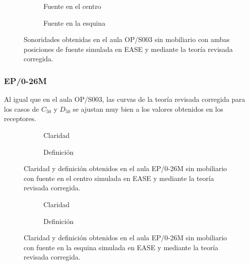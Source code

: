 \begin{figure}[ht]
    \begin{subfigure}[b]{0.4\textwidth}
    	\centering%
         {%
    }
    \caption{Fuente en el centro}%
    \end{subfigure}%
    \hspace{1.9cm}%
    \begin{subfigure}[b]{0.4\textwidth}%
    	\centering%
        {%
    }
    \caption{Fuente en la esquina}%
    \end{subfigure}
    \caption{Sonoridades obtenidas en el aula OP/S003 sin mobiliario con ambas posiciones de fuente simulada en EASE y mediante la teoría revisada corregida.}
\label{graf:sonoridadopesquina}%
\end{figure}
\FloatBarrier 

\subsubsection{EP/0-26M}
Al igual que en el aula OP/S003, las curvas de la teoría revisada corregida para los casos de $C_{50}$ y $D_{50}$ se ajustan muy bien a los valores obtenidos en los receptores.


\begin{figure}[ht]
    \begin{subfigure}[b]{0.4\textwidth}
    	\centering%
         {%
    }
    \caption{Claridad}%
    \end{subfigure}%
    \hspace{1.9cm}%
    \begin{subfigure}[b]{0.4\textwidth}%
    	\centering%
        {%
    }
    \caption{Definición}%
    \end{subfigure}
    \caption{Claridad y definición obtenidos en el aula EP/0-26M sin mobiliario con fuente en el centro simulada en EASE y mediante la teoría revisada corregida.}
\label{graf:claridaddefinicionepscentro}%
\end{figure}
\FloatBarrier 

\begin{figure}[ht]
    \begin{subfigure}[b]{0.4\textwidth}
    	\centering%
         {%
    }
    \caption{Claridad}%
    \end{subfigure}%
    \hspace{1.9cm}%
    \begin{subfigure}[b]{0.4\textwidth}%
    	\centering%
        {%
    }
    \caption{Definición}%
    \end{subfigure}
    \caption{Claridad y definición obtenidos en el aula EP/0-26M sin mobiliario con fuente en la esquina simulada en EASE y mediante la teoría revisada corregida.}
\label{graf:claridaddefinicionepsesquina}%
\end{figure}
\FloatBarrier 

